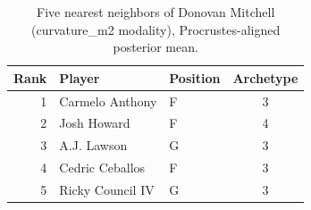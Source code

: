 \begin{table}[htbp]
  \centering\small
  \begin{tabular}{rllc}
    \toprule
    Rank & Player & Position & Archetype \\
    \midrule
    1 & Carmelo Anthony & F & 3 \\
    2 & Josh Howard & F & 4 \\
    3 & A.J. Lawson & G & 3 \\
    4 & Cedric Ceballos & F & 3 \\
    5 & Ricky Council IV & G & 3 \\
    \bottomrule
  \end{tabular}
  \caption{Five nearest neighbors of Donovan Mitchell (curvature_m2 modality), Procrustes-aligned posterior mean.}
  \label{tab:Donovan_Mitchell_neighbors_curvature_m2}
\end{table}

